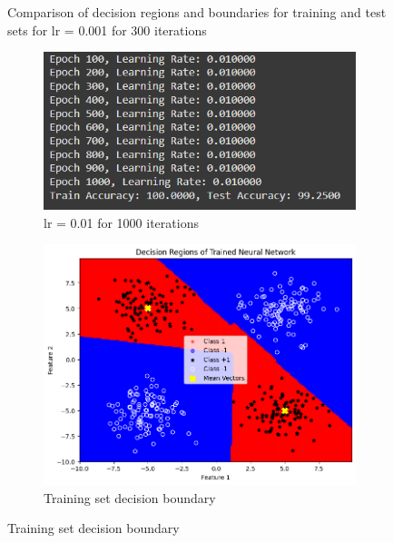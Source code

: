 \documentclass[a4paper,12pt]{article}
\begin{document}
\begin{figure}[H]
    \caption{Comparison of decision regions and boundaries for training and test sets for lr = 0.001 for 300 iterations}
\end{figure}

\begin{figure}[H]
    \centering
    \captionsetup[subfigure]{list=true} %

    \begin{subfigure}{0.5\textwidth}
        \centering
        \includegraphics[width=\textwidth]{2.3_.01_1000_r.png}
        \caption{lr = 0.01 for 1000 iterations}
    \end{subfigure}
    \begin{subfigure}{0.45\textwidth}
        \centering
        \includegraphics[width=\textwidth]{2.3_.01_1000_Train.png}
        \caption{Training set decision boundary}
    \end{subfigure}


\end{figure}
\end{document}
